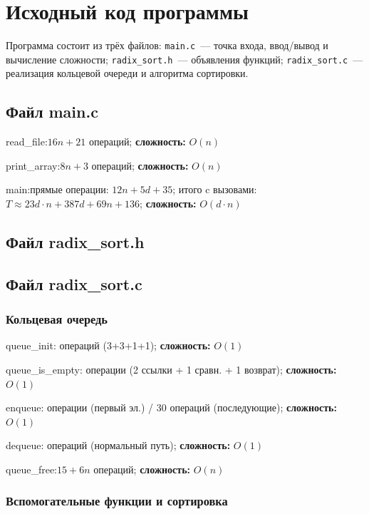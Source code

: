 \documentclass[a4paper,14pt]{extarticle}
\newcommand{\opcount}[2]{%
  \par\vspace{2pt}%
  \noindent
  \colorbox{gray!15}{%
    \parbox{\dimexpr\linewidth-2\fboxsep\relax}{%
      \small\bfseries\ttfamily\raggedright #1:\enskip #2%
    }%
  }%
  \par\vspace{6pt}%
}
\begin{document}
\newpage
\section{Исходный код программы}

Программа состоит из трёх файлов: \texttt{main.c}~--- точка входа, ввод/вывод и вычисление сложности; \texttt{radix\_sort.h}~--- объявления функций; \texttt{radix\_sort.c}~--- реализация кольцевой очереди и алгоритма сортировки.

\subsection{Файл main.c}


\opcount{read\_file}{$16n + 21$ операций; \textbf{сложность:} $O(n)$}
\opcount{print\_array}{$8n + 3$ операций; \textbf{сложность:} $O(n)$}
\opcount{main}{прямые операции: $12n + 5d + 35$; итого c вызовами: $T \approx 23d\cdot n + 387d + 69n + 136$; \textbf{сложность:} $O(d \cdot n)$}

\subsection{Файл radix\_sort.h}



\subsection{Файл radix\_sort.c}

\subsubsection*{Кольцевая очередь}


\opcount{queue\_init}{8 операций (3+3+1+1); \textbf{сложность:} $O(1)$}
\opcount{queue\_is\_empty}{4 операции (2 ссылки + 1 сравн. + 1 возврат); \textbf{сложность:} $O(1)$}
\opcount{enqueue}{23 операции (первый эл.) / 30 операций (последующие); \textbf{сложность:} $O(1)$}
\opcount{dequeue}{26 операций (нормальный путь); \textbf{сложность:} $O(1)$}
\opcount{queue\_free}{$15 + 6n$ операций; \textbf{сложность:} $O(n)$}

\subsubsection*{Вспомогательные функции и сортировка}
\end{document}
